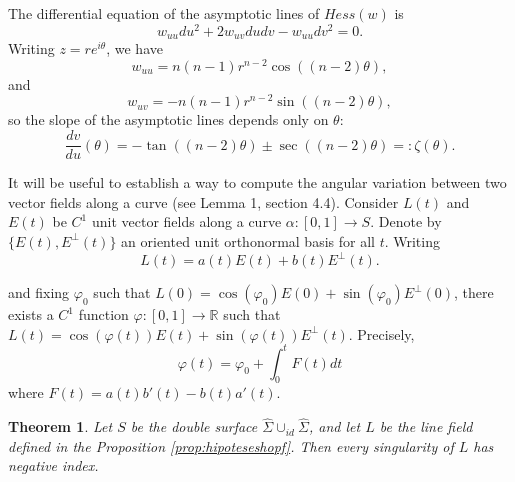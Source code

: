 \documentclass[11pt,reqno]{amsart}
\newtheorem{theorem}{Theorem}[section]
\begin{document}
The differential equation of the asymptotic lines of $Hess(w)$ is
\begin{equation*}
    w_{uu}du^2+2w_{uv}dudv-w_{uu}dv^2=0.
\end{equation*}
Writing $z=re^{i\theta}$, we have 
\begin{equation*}
    w_{uu}=n(n-1)r^{n-2}\cos((n-2)\theta),
\end{equation*}
and
\begin{equation*}
    w_{uv}=-n(n-1)r^{n-2}\sin((n-2)\theta), 
\end{equation*}
so the slope of the asymptotic lines depends only on $\theta$:
\begin{equation*}
    \frac{dv}{du}(\theta)=-\tan((n-2)\theta)\pm\sec((n-2)\theta)=:\zeta(\theta).
\end{equation*}

It will be useful to establish a way to compute the angular variation between two vector fields along a curve (see \cite{docarmo2016} Lemma 1, section 4.4). Consider $L(t)$ and $E(t)$ be $C^1$ unit vector fields along a curve $\alpha: [0,1] \to S$. Denote by $\{E(t),E^\perp(t)\}$ an oriented unit orthonormal basis for all $t$. Writing 
\begin{equation*}
    L(t)=a(t)E(t)+b(t)E^\perp(t).
\end{equation*}

 and fixing $\varphi_0$ such that $L(0)=\cos(\varphi_0)E(0)+\sin(\varphi_0)E^\perp(0)$, there exists a $C^1$ function $\varphi: [0,1] \to \mathbb{R}$ such that $L(t)=\cos(\varphi(t))E(t)+\sin(\varphi(t))E^\perp(t)$. Precisely,
\begin{equation}\label{angularvariation}
    \varphi(t)=\varphi_0+\int_0^tF(t)dt
\end{equation}
where $F(t)=a(t)b'(t)-b(t)a'(t)$.

\begin{theorem}\label{thm:negativeindex}
    Let $S$ be the double surface $\widehat{\Sigma}\cup_{id}\widehat{\Sigma}$, and let $L$ be the line field defined in the Proposition \ref{prop:hipoteseshopf}. Then every singularity of $L$ has negative index.
\end{theorem}
\end{document}
